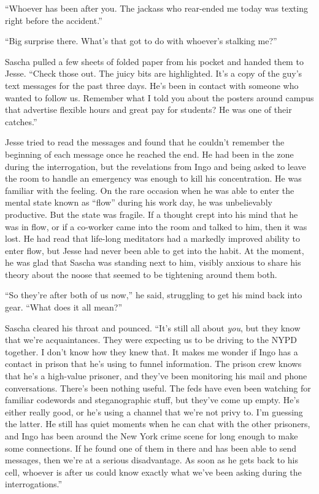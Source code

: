 \documentclass[12pt]{book}
\begin{document}
``Whoever has been after you.  The jackass who rear-ended me today was texting right before the accident.''

``Big surprise there.  What's that got to do with whoever's stalking me?''

Sascha pulled a few sheets of folded paper from his pocket and handed them to Jesse.  ``Check those out.  The juicy bits are highlighted.  It's a copy of the guy's text messages for the past three days.  He's been in contact with someone who wanted to follow us.  Remember what I told you about the posters around campus that advertise flexible hours and great pay for students?  He was one of their catches.''

Jesse tried to read the messages and found that he couldn't remember the beginning of each message once he reached the end.  He had been in the zone during the interrogation, but the revelations from Ingo and being asked to leave the room to handle an emergency was enough to kill his concentration.  He was familiar with the feeling.  On the rare occasion when he was able to enter the mental state known as ``flow'' during his work day, he was unbelievably productive.  But the state was fragile.  If a thought crept into his mind that he was in flow, or if a co-worker came into the room and talked to him, then it was lost.  He had read that life-long meditators had a markedly improved ability to enter flow, but Jesse had never been able to get into the habit.  At the moment, he was glad that Sascha was standing next to him, visibly anxious to share his theory about the noose that seemed to be tightening around them both.

``So they're after both of us now,'' he said, struggling to get his mind back into gear.  ``What does it all mean?''

Sascha cleared his throat and pounced.  ``It's still all about \emph{you}, but they know that we're acquaintances.  They were expecting us to be driving to the NYPD together.  I don't know how they knew that.  It makes me wonder if Ingo has a contact in prison that he's using to funnel information.  The prison crew knows that he's a high-value prisoner, and they've been monitoring his mail and phone conversations.  There's been nothing useful.  The feds have even been watching for familiar codewords and steganographic stuff, but they've come up empty.  He's either really good, or he's using a channel that we're not privy to.  I'm guessing the latter.  He still has quiet moments when he can chat with the other prisoners, and Ingo has been around the New York crime scene for long enough to make some connections.  If he found one of them in there and has been able to send messages, then we're at a serious disadvantage.  As soon as he gets back to his cell, whoever is after us could know exactly what we've been asking during the interrogations.''
\end{document}
